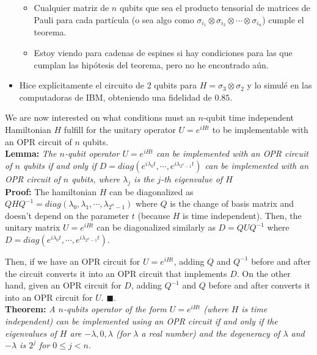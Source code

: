 \begin{itemize}
\begin{itemize}
\item Cualquier matriz de $n$ qubits que sea el producto tensorial de matrices de Pauli para cada partícula (o sea algo como $\sigma_{i_1} \otimes \sigma_{i_2} \otimes \cdots \otimes \sigma_{i_n}$) cumple el teorema.
\item Estoy viendo para cadenas de espines si hay condiciones para las que cumplan las hipótesis del teorema, pero no he encontrado aún.
\end{itemize}
\item Hice explícitamente el circuito de 2 qubits para $H = \sigma_3 \otimes \sigma_2$ y lo simulé en las computadoras de IBM, obteniendo una fidelidad de $0.85$.
\end{itemize}
\newpage

We are now interested on what conditions must an $n$-qubit time independent Hamiltonian $H$
fulfill for the unitary operator $U = e^{iHt}$ to be
implementable with an OPR circuit of $n$ qubits. \\


\textbf{Lemma:} \textit{The $n$-qubit operator $U = e^{iHt}$ can be implemented with an OPR circuit of $n$ qubits
if and only if $D = diag(e^{i\lambda_0 t}, \cdots, e^{i\lambda_{2^n-1}t})$ can be implemented with an OPR circuit of $n$ qubits,
where $\lambda_j$ is the $j$-th eigenvalue of $H$}\\

\textbf{Proof:} The hamiltonian $H$ can be diagonalized as $QHQ^{-1} = diag(\lambda_0,\lambda_1, \cdots,\lambda_{2^n-1})$
 where $Q$ is the  change of  basis matrix and doesn't depend on the parameter $t$ 
 (because $H$ is time independent). Then, the unitary matrix $U = e^{iHt}$ can be diagonalized similarly as $D = QUQ^{-1}$ where $D = diag(e^{i\lambda_0 t}, \cdots, e^{i\lambda_{2^n-1}t})$.
 
Then, if we have an OPR circuit for $U = e^{iHt}$, adding $Q$ and $Q^{-1}$ before and after the circuit converts it into an OPR circuit that
implements $D$. On the other hand, given an OPR circuit for $D$, adding $Q^{-1}$ and $Q$ before and after
converts it into an OPR circuit for $U$. $\blacksquare$. \\


\textbf{Theorem:} \textit{A $n$-qubits operator of the form $U = e^{iHt}$ (where $H$ is time independent) can be implemented 
using an OPR circuit if and only if the eigenvalues of $H$
are $-\lambda, 0, \lambda$ (for $\lambda$ a real number) and the degeneracy of $\lambda$ and $-\lambda$ is $2^j$ for $0 \leq j < n$.} \\

